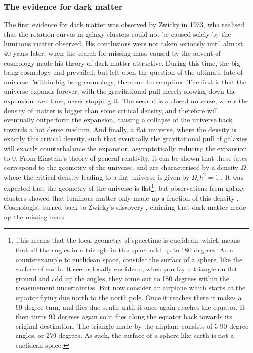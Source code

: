\subsubsection{The evidence for dark matter}
The first evidence for dark matter was observed by Zwicky \cite{Zwicky} in 1933, who realised that the rotation curves in galaxy clusters could not be caused solely by the luminous matter observed. His conclusions were not taken seriously until almost 40 years later, when the search for missing mass caused by the advent of cosmology made his theory of dark matter attractive. During this time, the big bang cosmology had prevailed, but left open the question of the ultimate fate of universe. Within big bang cosmology, there are three option. The first is that the universe expands forever, with the gravitational pull merely slowing down the expansion over time, never stopping it. The second is a closed universe, where the density of matter is bigger than some critical density, and therefore will eventually outperform the expansion, causing a collapse of the universe back towards a hot dense medium. And finally, a flat universe, where the density is exactly this critical density, such that eventually the gravitational pull of galaxies will exactly counterbalance the expansion, asymptotically reducing the expansion to 0. From Einstein's theory of general relativity, it can be shown that these fates correspond to the geometry of the universe, and are characterised by a density $\Omega$, where the critical density leading to a flat universe is given by $\Omega_c h^2= 1$ \cite{PDG2022, Planck2020}. It was expected that the geometry of the universe is flat\footnote{This means that the local geometry of spacetime is euclidean, which means that all the angles in a triangle in this space add up to 180 degrees. As a counterexample to euclidean space, consider the surface of a sphere, like the surface of earth. It seems locally euclidean, when you lay a triangle on flat ground and add up the angles, they come out to 180 degrees within the measurement uncertainties. But now consider an airplane which starts at the equator flying due north to the north pole. Once it reaches there it makes a 90 degree turn, and flies due south until it once again reaches the equator. It then turns 90 degrees again so it flies along the equator back towards its original destination. The triangle made by the airplane consists of 3 90 degree angles, or 270 degrees. As such, the surface of a sphere like earth is not a euclidean space.}, but observations from galaxy clusters showed that luminous matter only made up a fraction of this density \cite{Planck2020}. %
Cosmologist turned back to Zwicky's discovery \cite{history_of_dark_matter, Ostriker_return_to_DM}, claiming that dark matter made up the missing mass. \\

